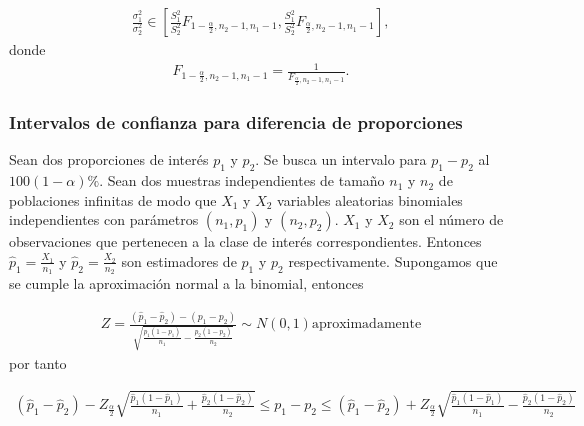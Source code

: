 \documentclass[a4paper]{report} %
\begin{document}
\begin{eqnarray}
\frac{\sigma_{1}^{2}}{\sigma_{2}^{2}}\in \left[\frac{S_{1}^{2}}{S_{2}^{2}}F_{1-\frac{\alpha}{2},n_{2}-1,n_{1}-1}, \frac{S_{1}^{2}}{S_{2}^{2}}F_{\frac{\alpha}{2},n_{2}-1,n_{1}-1}\right],
\end{eqnarray}
donde
\begin{eqnarray}
F_{1-\frac{\alpha}{2},n_{2}-1,n_{1}-1}=\frac{1}{F_{\frac{\alpha}{2},n_{2}-1,n_{1}-1}}.
\end{eqnarray}

\subsubsection{Intervalos de confianza para diferencia de proporciones}


Sean dos proporciones de inter\'es $p_{1}$ y $p_{2}$. Se busca un intervalo para $p_{1}-p_{2}$ al $100\left(1-\alpha\right)\%$. Sean dos muestras independientes de tama\~no $n_{1}$ y $n_{2}$ de poblaciones infinitas de modo que $X_{1}$ y $X_{2}$ variables aleatorias binomiales independientes con par\'ametros $\left(n_{1},p_{1}\right)$ y $\left(n_{2},p_{2}\right)$.  $X_{1}$ y $X_{2}$ son  el n\'umero de observaciones que pertenecen a la clase de inter\'es correspondientes. Entonces $\hat{p}_{1}=\frac{X_{1}}{n_{1}}$ y $\hat{p}_{2}=\frac{X_{2}}{n_{2}}$ son estimadores de $p_{1}$ y $p_{2}$ respectivamente. Supongamos que se cumple la aproximaci\'on  normal a la binomial, entonces

\begin{eqnarray}
Z=\frac{\left(\hat{p}_{1}-\hat{p}_{2}\right)-\left(p_{1}-p_{2}\right)}{\sqrt{\frac{p_{1}\left(1-p_{1}\right)}{n_{1}}-\frac{p_{2}\left(1-p_{2}\right)}{n_{2}}}}\sim N\left(0,1\right)\textrm{aproximadamente}
\end{eqnarray}
por tanto

\begin{eqnarray}
\left(\hat{p}_{1}-\hat{p}_{2}\right)-Z_{\frac{\alpha}{2}}\sqrt{\frac{\hat{p}_{1}\left(1-\hat{p}_{1}\right)}{n_{1}}+\frac{\hat{p}_{2}\left(1-\hat{p}_{2}\right)}{n_{2}}}\leq p_{1}-p_{2}\leq\left(\hat{p}_{1}-\hat{p}_{2}\right)+Z_{\frac{\alpha}{2}}\sqrt{\frac{\hat{p}_{1}\left(1-\hat{p}_{1}\right)}{n_{1}}-\frac{\hat{p}_{2}\left(1-\hat{p}_{2}\right)}{n_{2}}}
\end{eqnarray}
\end{document}
